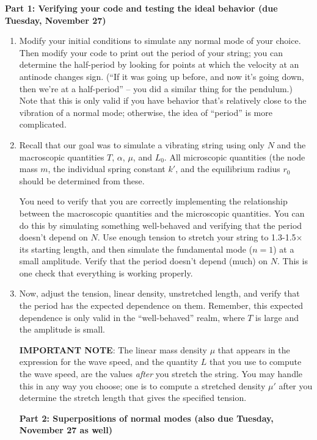 \documentclass[12pt]{article}
\begin{document}
{\bf Part 1: Verifying your code and testing the ideal behavior (due Tuesday, November 27)}
\begin{enumerate}

\item{Modify your initial conditions to simulate any normal mode of your choice. Then modify your code to print out the period of your string; you can determine the half-period by looking for points at which the velocity at an
antinode changes sign. (``If it was going up before, and now it's going down, then we're at a half-period'' -- you did a similar thing for the pendulum.) Note that this is only valid if you have behavior that's relatively close to the vibration
of a normal mode; otherwise, the idea of ``period'' is more complicated.}

\item{Recall that our goal was to simulate a vibrating string using only $N$ and the macroscopic quantities $T$, $\alpha$, $\mu$, and $L_0$. All microscopic quantities (the node mass $m$, the individual spring constant $k'$, and the equilibrium radius $r_0$
  should be determined from these.

You need to verify that you are correctly implementing the relationship between the macroscopic quantities and the microscopic quantities. You can do this by simulating something well-behaved and verifying that
the period doesn't depend on $N$. Use enough tension to stretch your string to 1.3-1.5$\times$ its starting length, and then simulate the fundamental mode ($n=1$) at a small amplitude. Verify that the period doesn't depend (much) on $N$. This is one check that
everything is working properly.}


\item{Now, adjust the tension, linear density, unstretched length, and verify that the period has the expected dependence on them. Remember, this expected dependence is only valid in the ``well-behaved'' realm, where $T$ is large and the amplitude is small.}


{\bf IMPORTANT NOTE}: The linear mass density $\mu$ that appears in the expression for the wave speed, and the quantity $L$ that you use to compute the wave speed, are the values {\it after} you stretch the string. You may handle this in any way you choose;
one is to compute a stretched density {$\mu'$} after you determine the stretch length that gives the specified tension.
 

{\bf Part 2: Superpositions of normal modes (also due Tuesday, November 27 as well)}


\end{enumerate}
\end{document}
